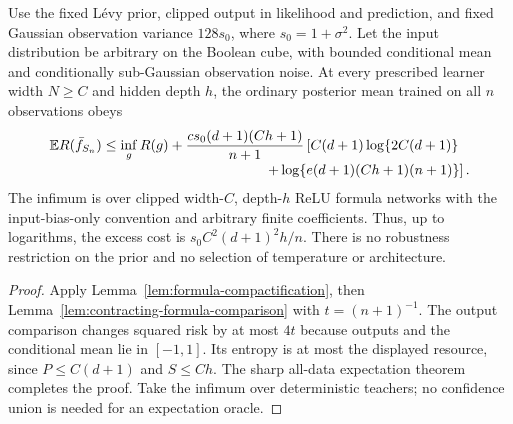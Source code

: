 \begin{theorem}
\label{thm:formula-expected-oracle}
Use the fixed L\'evy prior, clipped output in likelihood and prediction, and fixed Gaussian observation variance $128s_0$, where $s_0=1+\sigma^2$. Let the input distribution be arbitrary on the Boolean cube, with bounded conditional mean and conditionally sub-Gaussian observation noise. At every prescribed learner width $N\ge C$ and hidden depth $h$, the ordinary posterior mean trained on all $n$ observations obeys
\begin{align*}
 \E R(\bar f_{S_n})\le\inf_g R(g)
 &+\frac{c s_0(d+1)(Ch+1)}{n+1}
 \left[C(d+1)\log\{2C(d+1)\}\right.
 \\[-1mm]&\hspace{24mm}\left.+\log\{e(d+1)(Ch+1)(n+1)\}\right].
\end{align*}
The infimum is over clipped width-$C$, depth-$h$ ReLU formula networks with the input-bias-only convention and arbitrary finite coefficients. Thus, up to logarithms, the excess cost is $s_0 C^2(d+1)^2h/n$. There is no robustness restriction on the prior and no selection of temperature or architecture.
\end{theorem}
\begin{proof}
Apply Lemma~\ref{lem:formula-compactification}, then Lemma~\ref{lem:contracting-formula-comparison} with $t=(n+1)^{-1}$. The output comparison changes squared risk by at most $4t$ because outputs and the conditional mean lie in $[-1,1]$. Its entropy is at most the displayed resource, since $P\le C(d+1)$ and $S\le Ch$. The sharp all-data expectation theorem completes the proof. Take the infimum over deterministic teachers; no confidence union is needed for an expectation oracle.
\end{proof}

